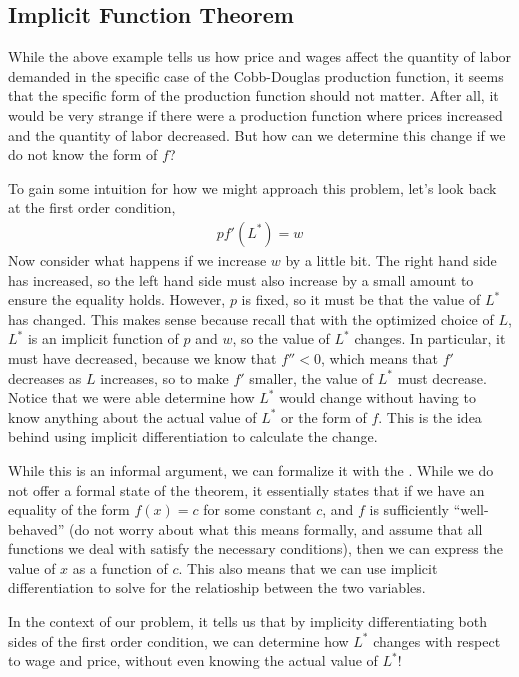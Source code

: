 \subsection*{Implicit Function Theorem}
While the above example tells us how price and wages affect the quantity of labor demanded in the specific case of the Cobb-Douglas production function, it seems that the specific form of the production function should not matter. After all, it would be very strange if there were a production function where prices increased and the quantity of labor decreased. But how can we determine this change if we do not know the form of $f$?

To gain some intuition for how we might approach this problem, let's look back at the first order condition,
\begin{align*}
    p f'(L^*) = w
\end{align*}
Now consider what happens if we increase $w$ by a little bit. The right hand side has increased, so the left hand side must also increase by a small amount to ensure the equality holds. However, $p$ is fixed, so it must be that the value of $L^*$ has changed. This makes sense because recall that with the optimized choice of $L$, $L^*$ is an implicit function of $p$ and $w$, so the value of $L^*$ changes.  In particular, it must have decreased, because we know that $f'' < 0$, which means that $f'$ decreases as $L$ increases, so to make $f'$ smaller, the value of $L^*$ must decrease. Notice that we were able determine how $L^*$ would change without having to know anything about the actual value of $L^*$ or the form of $f$. This is the idea behind using implicit differentiation to calculate the change. 

While this is an informal argument, we can formalize it with the . While we do not offer a formal state of the theorem, it essentially states that if we have an equality of the form $f(x) = c$ for some constant $c$, and $f$ is sufficiently ``well-behaved'' (do not worry about what this means formally, and assume that all functions we deal with satisfy the necessary conditions), then we can express the value of $x$ as a function of $c$. This also means that we can use implicit differentiation to solve for the relatioship between the two variables.

In the context of our problem, it tells us that by implicity differentiating both sides of the first order condition, we can determine how $L^*$ changes with respect to wage and price, without even knowing the actual value of $L^*$!

